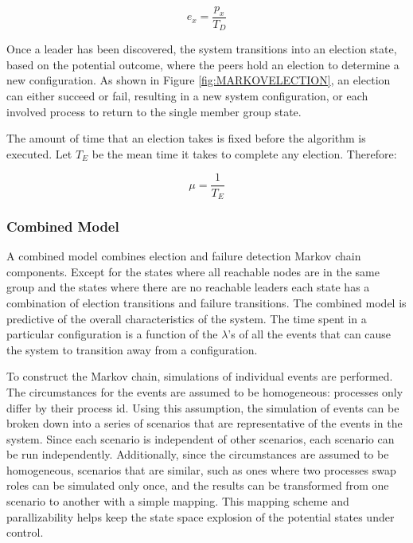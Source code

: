 \begin{equation}
e_x = \frac{p_{x}}{T_{D}}
\end{equation}

Once a leader has been discovered, the system transitions into an election state, based on the
potential outcome, where the peers hold an election to determine a new configuration. As shown
in Figure \ref{fig:MARKOVELECTION}, an election can either succeed or fail, resulting in a new system
configuration, or each involved process to return to the single member group state.

The amount of time that an election takes is fixed before the algorithm is executed.
Let $T_{E}$ be the mean time it takes to complete any election. Therefore:

\begin{equation}
\mu = \frac{1}{T_{E}}
\end{equation}

\subsubsection{Combined Model}

A combined model combines election and failure detection Markov chain components. Except for the
states where all reachable nodes are in the same group and the states where there are no reachable
leaders each state has a combination of election transitions and failure transitions.                           
The combined model is predictive of the overall characteristics of the system. The
time spent in a particular configuration is a function of the $\lambda$'s of all the
events that can cause the system to transition away from a configuration.

To construct the Markov chain, simulations of individual events are performed. The circumstances
for the events are assumed to be homogeneous: processes only differ by their process id.
Using this assumption, the simulation of events can be broken down into a series of scenarios
that are representative of the events in the system. Since each scenario is independent of other
scenarios, each scenario can be run independently.  Additionally, since the circumstances
are assumed to be homogeneous, scenarios that are similar, such as ones where two processes
swap roles can be simulated only once, and the results can be transformed from one scenario
to another with a simple mapping. This mapping scheme and parallizability helps keep the
state space explosion of the potential states under control.

